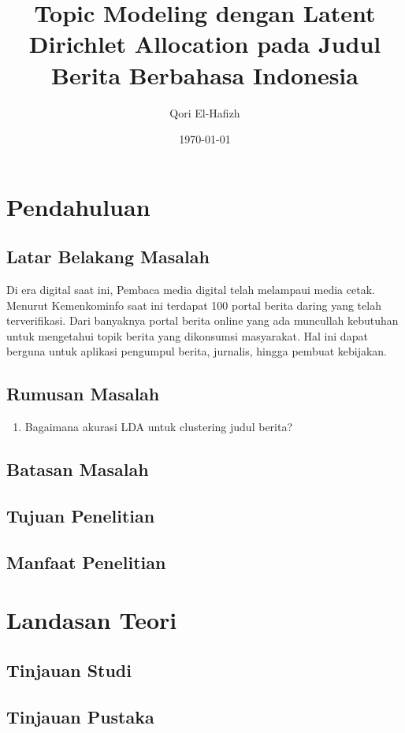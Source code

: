 \documentclass[a4paper,12pt]{report}
\title{Topic Modeling dengan Latent Dirichlet Allocation pada Judul Berita Berbahasa Indonesia}
\author{Qori El-Hafizh}
\date{\today}
\begin{document}
\maketitle

\begin{abstract}
\end{abstract}

\tableofcontents

\chapter{Pendahuluan}
\section{Latar Belakang Masalah}
Di era digital saat ini, Pembaca media digital telah melampaui media cetak.
Menurut Kemenkominfo saat ini terdapat 100 portal berita daring yang telah terverifikasi.
Dari banyaknya portal berita online yang ada muncullah kebutuhan untuk mengetahui topik berita yang dikonsumsi masyarakat.
Hal ini dapat berguna untuk aplikasi pengumpul berita, jurnalis, hingga pembuat kebijakan.
\section{Rumusan Masalah}
\begin{enumerate}
    \item Bagaimana akurasi LDA untuk clustering judul berita?
\end{enumerate}
\section{Batasan Masalah}
\section{Tujuan Penelitian}
\section{Manfaat Penelitian}

\chapter{Landasan Teori}
\section{Tinjauan Studi}
\section{Tinjauan Pustaka}
\end{document}
